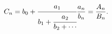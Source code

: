 \[C_{n}=b_{0}+\cfrac{a_{1}}{b_{1}+\cfrac{a_{2}}{b_{2}+\cdots}}\frac{a_{n}}{b_{n}%
}=\frac{A_{n}}{B_{n}}.\]